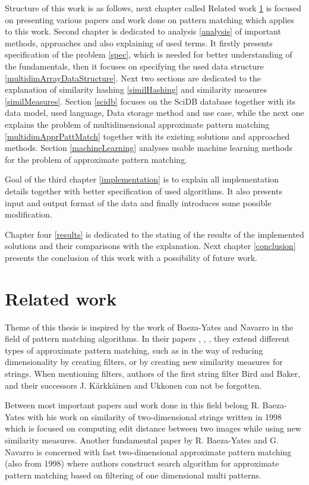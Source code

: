Structure of this work is as follows, next chapter called Related work \ref{relatedWork} is focused on presenting various papers and work done on pattern matching which applies to this work. Second chapter is dedicated to analysis \ref{analysis} of important methods, approaches and also explaining of used terms. It firstly presents specification of the problem \ref{spec}, which is needed for better understanding of the fundamentals, then it focuses on specifying the used data structure \ref{multidimArrayDataStructure}. Next two sections are dedicated to the explanation of similarity hashing \ref{similHashing} and similarity measures \ref{similMeasures}. Section \ref{scidb} focuses on the SciDB database together with its data model, used language, Data storage method and use case, while the next one explains the problem of multidimensional approximate pattern matching \ref{multidimApprPattMatch} together with its existing solutions and approached methods. Section \ref{machineLearning} analyses usable machine learning methods for the problem of approximate pattern matching.

Goal of the third chapter \ref{implementation} is to explain all implementation details together with better specification of used algorithms. It also presents input and output format of the data and finally introduces some possible modification.

Chapter four \ref{results} is dedicated to the stating of the results of the implemented solutions and their comparisons with the explanation. Next chapter \ref{conclusion} presents the conclusion of this work with a possibility of future work. 


\chapter{Related work} \label{relatedWork}
Theme of this thesis is inspired by the work of Baeza-Yates and Navarro in the field of pattern matching algorithms. In their papers \cite{mdApproxPM}, \cite{fast2DapproxPM}, \cite{fastMDApproxPM}, they extend different types of approximate pattern matching, such as in the way of reducing dimensionality by creating filters, or by creating new similarity measures for strings. When mentioning filters, authors of the first string filter Bird and Baker, and their successors J. K{\" a}rkk{\" a}inen and Ukkonen can not be forgotten.

Between most important papers and work done in this field belong R. Baeza-Yates with his work on similarity of two-dimensional strings written in 1998 \cite{sim2Dstrings} which is focused on computing edit distance between two images while using new similarity measures. Another fundamental paper by R. Baeza-Yates and G. Navarro \cite{fast2DapproxPM} is concerned with fast two-dimensional approximate pattern matching (also from 1998) where authors construct search algorithm for approximate pattern matching based on filtering of one dimensional multi patterns.

